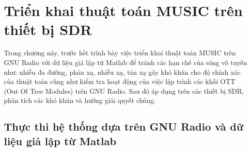 \setcounter{chapter}{2}
\chapter[\MakeUppercase{Triển khai thuật toán MUSIC trên thiết bị SDR}]{Triển khai thuật toán MUSIC trên thiết bị SDR}
Trong chương này, trước hết trình bày việc triển khai thuật toán MUSIC trên GNU Radio với dữ liệu giả lập từ Matlab để tránh các hạn chế của sóng vô tuyến như: nhiễu đa đường, phản xạ, nhiễu xạ, tán xạ gây khó khăn cho độ chính xác của thuật toán cũng như kiểm tra hoạt động của việc lập trình các khối OTT (Out Of Tree Modules) trên GNU Radio. Sau đó áp dụng trên các thiết bị SDR, phân tích các khó khăn và hướng giải quyết chúng.

\section{Thực thi hệ thống dựa trên GNU Radio và dữ liệu giả lập từ Matlab}
